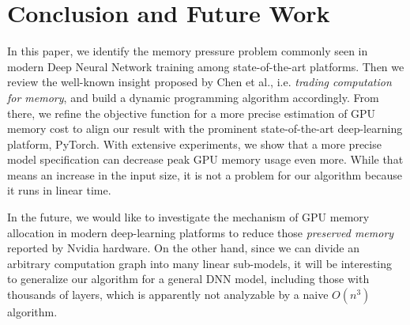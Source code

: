 \section{Conclusion and Future Work}\label{sec:conclusion}


In this paper, we identify the memory pressure problem commonly seen in modern Deep Neural Network training among state-of-the-art platforms. Then we review the well-known insight proposed by Chen et al., i.e. {\em trading computation for memory}, and build a dynamic programming algorithm accordingly. From there, we refine the objective function for a more precise estimation of GPU memory cost to align our result with the prominent state-of-the-art deep-learning platform, PyTorch. With extensive experiments, we show that a more precise model specification can decrease peak GPU memory usage even more. While that means an increase in the input size, it is not a problem for our algorithm because it runs in linear time.

In the future, we would like to investigate the mechanism of GPU memory allocation in modern deep-learning platforms to reduce those {\em preserved memory} reported by Nvidia hardware. On the other hand, since we can divide an arbitrary computation graph into many linear sub-models, it will be interesting to generalize our algorithm for a general DNN model, including those with thousands of layers, which is apparently not analyzable by a naive $O(n^3)$ algorithm.
